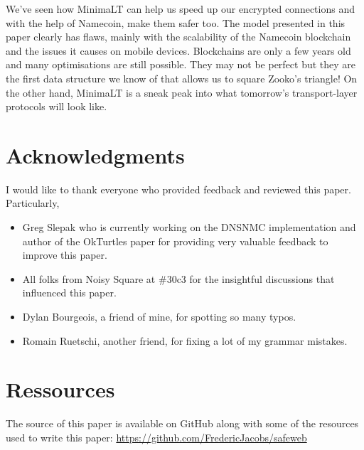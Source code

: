 \documentclass{vldb}
\begin{document}
We've seen how MinimaLT can help us speed up our encrypted connections and with the help of Namecoin, make them safer too. The model presented in this paper clearly has flaws, mainly with the scalability of the Namecoin blockchain and the issues it causes on mobile devices. Blockchains are only a few years old and many optimisations are still possible. They may not be perfect but they are the first data structure we know of that allows us to square Zooko's triangle! On the other hand, MinimaLT is a sneak peak into what tomorrow's transport-layer protocols will look like.

\balance

\section{Acknowledgments}
I would like to thank everyone who provided feedback and reviewed this paper. Particularly, 
\begin{itemize}
\item Greg Slepak who is currently working on the DNSNMC implementation and author of the OkTurtles\cite{okTurtles} paper for providing very valuable feedback to improve this paper.
\item All folks from Noisy Square at \#30c3 for the insightful discussions that influenced this paper.
\item Dylan Bourgeois, a friend of mine, for spotting so many typos.
\item Romain Ruetschi, another friend, for fixing a lot of my grammar mistakes.
\end{itemize}

\section{Ressources}

The source of this paper is available on GitHub along with some of the resources used to write this paper: \newline
\url{https://github.com/FredericJacobs/safeweb}



\end{document}

